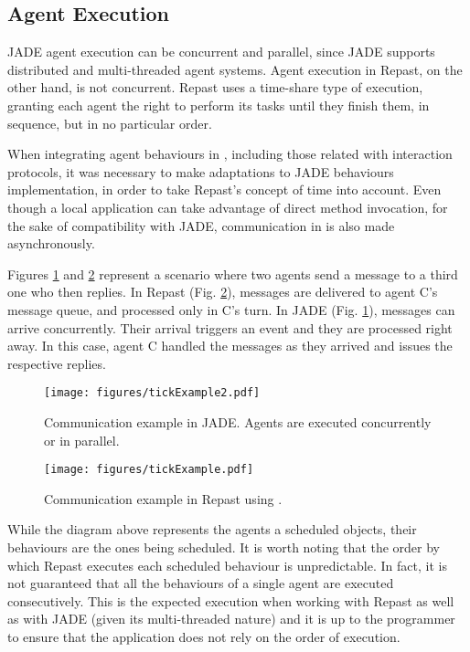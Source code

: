 \subsection{Agent Execution}

JADE agent execution can be concurrent and parallel, since JADE supports distributed and multi-threaded agent systems. Agent execution in Repast, on the other hand, is not concurrent. Repast uses a time-share type of execution, granting each agent the right to perform its tasks until they finish them, in sequence, but in no particular order.

When integrating agent behaviours in \apiname{}, including those related with interaction protocols, it was necessary to make adaptations to JADE behaviours implementation, in order to take Repast's concept of time into account. Even though a local application can take advantage of direct method invocation, for the sake of compatibility with JADE, communication in \apiname{} is also made asynchronously.

Figures \ref{fig:com-example-jade} and \ref{fig:com-example-repast} represent a scenario where two agents send a message to a third one who then replies. In Repast (Fig. \ref{fig:com-example-repast}), messages are delivered to agent C's message queue, and processed only in C's turn. In JADE (Fig. \ref{fig:com-example-jade}), messages can arrive concurrently. Their arrival triggers an event and they are processed right away. In this case, agent C handled the messages as they arrived and issues the respective replies.

\begin{figure}
	\centering
	\texttt{[image: figures/tickExample2.pdf]}
	\caption{
		Communication example in JADE. Agents are executed concurrently or in parallel. 
	}
	\label{fig:com-example-jade}
\end{figure}

\begin{figure}[h]
	\centering
	\texttt{[image: figures/tickExample.pdf]}
	\caption{
		Communication example in Repast using \apiname{}.
	}
	\label{fig:com-example-repast}
\end{figure}

While the diagram above represents the agents a scheduled objects, their behaviours are the ones being scheduled. It is worth noting that the order by which Repast executes each scheduled behaviour is unpredictable. In fact, it is not guaranteed that all the behaviours of a single agent are executed consecutively. This is the expected execution when working with Repast as well as with JADE (given its multi-threaded nature) and it is up to the programmer to ensure that the application does not rely on the order of execution.

